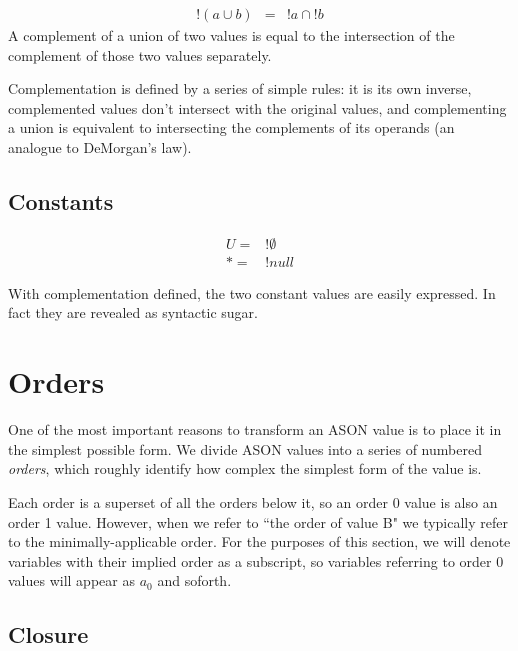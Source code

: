 \documentclass[letterpaper]{article}
\begin{document}
\begin{prule}
\label{sec:demorgan}
\begin{equation}
\begin{array}{rcl}
	! (a \cup b) &=& !a \cap !b
\end{array}
\end{equation}
A complement of a union of two values is equal to the intersection of the
complement of those two values separately.
\end{prule}

Complementation is defined by a series of simple rules: it is its own inverse,
complemented values don't intersect with the original values, and complementing
a union is equivalent to intersecting the complements of its operands (an
analogue to DeMorgan's law).

\subsection{Constants}
\begin{equation}
\begin{split}
U = &!\emptyset \\
* = &!null
\end{split}
\end{equation}

With complementation defined, the two constant values are easily expressed. In
fact they are revealed as syntactic sugar.

\section{Orders}

One of the most important reasons to transform an ASON value is to place it in
the simplest possible form. We divide ASON values into a series of numbered
\textit{orders}, which roughly identify how complex the simplest form of the
value is.

Each order is a superset of all the orders below it, so an order 0 value is
also an order 1 value. However, when we refer to ``the order of value B" we
typically refer to the minimally-applicable order. For the purposes of this
section, we will denote variables with their implied order as a subscript, so
variables referring to order 0 values will appear as \(a_0\) and soforth.

\subsection{Closure}
\end{document}
